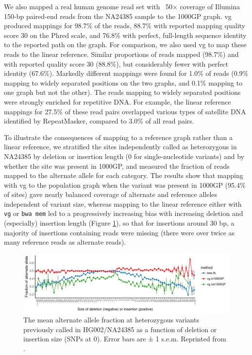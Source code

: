 We also mapped a real human genome read set with ~50× coverage of Illumina 150-bp paired-end reads from the NA24385 sample to the 1000GP graph. vg produced mappings for 98.7\% of the reads, 88.7\%
with reported mapping quality score 30 on the Phred scale, and 76.8\% with perfect, full-length sequence identity to the reported path on the graph.
For comparison, we also used vg to map these reads to the linear reference.
Similar proportions of reads mapped (98.7\%) and with reported quality score 30 (88.8\%), but considerably fewer with perfect identity (67.6\%).
Markedly different mappings were found for 1.0\% of reads (0.9\% mapping to widely separated positions on the two graphs, and 0.1\% mapping to one graph but not the other).
The reads mapping to widely separated positions were strongly enriched for repetitive DNA. For example, the linear reference mappings for 27.5\% of these read pairs overlapped various types of satellite DNA identified by RepeatMasker, compared to 3.0\% of all read pairs.

To illustrate the consequences of mapping to a reference graph rather than a linear reference, we stratified the sites independently called as heterozygous in NA24385 by deletion or insertion length (0 for single-nucleotide variants) and by whether the site was present in 1000GP, and measured the fraction of reads mapped to the alternate allele for each category.
The results show that mapping with vg to the population graph when the variant was present in 1000GP (95.4\% of sites) gave nearly balanced coverage of alternate and reference alleles independent of variant size, whereas mapping to the linear reference either with {\tt vg} or {\tt bwa mem} led to a progressively increasing bias with increasing deletion and (especially) insertion length (Figure \ref{fig:HG002_indels}), so that for insertions around 30 bp, a majority of insertions containing reads were missing (there were over twice as many reference reads as alternate reads).

\begin{figure}[htbp!] 
\centering    
\includegraphics[width=1.0\textwidth]{Chapter3/Figs/HG002_wg_pan_ref_bwa_true_hets_allele_balance_tsv_gz_3.pdf}
\caption[Indel allele balance in HG002]{The mean alternate allele fraction at heterozygous variants previously called in HG002/NA24385 as a function of deletion or insertion size (SNPs at 0). Error bars are ± 1 s.e.m.
  Reprinted from \cite{garrison2018variation}.}
\label{fig:HG002_indels}
\end{figure}

